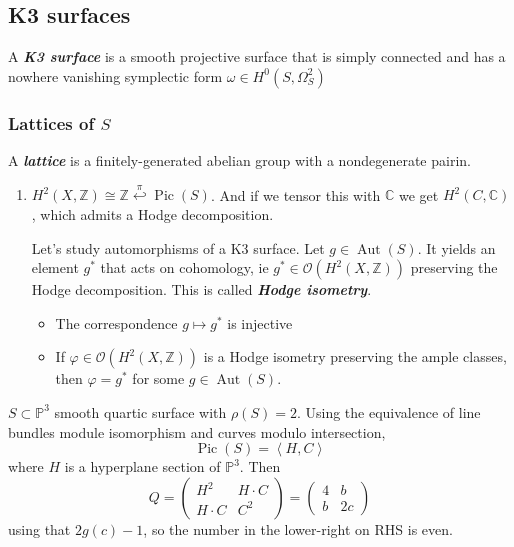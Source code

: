 \subsection{K3 surfaces}

\begin{defn}
	A \textit{\textbf{K3 surface}} is a smooth projective surface that is simply connected and has a nowhere vanishing symplectic form $\omega\in H^{0}(S,\Omega^2_S)$
\end{defn}

\subsubsection{Lattices of $S$}

A \textit{\textbf{lattice}} is a finitely-generated abelian group with a nondegenerate pairin.

\begin{enumerate}
	\item $H^{2}(X,\mathbb{Z})\cong \mathbb{Z} \overset{\pi}{\hookleftarrow}\operatorname{Pic}(S) $. And if we tensor this with $\mathbb{C}$ we get $H^{2}(C,\mathbb{C})$, which admits a Hodge decomposition.

		Let's study automorphisms of a K3 surface. Let $g\in\operatorname{Aut}(S)$. It yields an element $g^*$ that acts on cohomology, ie $g^*\in\mathcal{O}(H^{2}(X,\mathbb{Z}))$ preserving the Hodge decomposition. This is called \textit{\textbf{Hodge isometry}}.

\begin{thm}\leavevmode
	\begin{itemize}
	\item The correspondence $g\mapsto g^*$ is injective 
	
	\item If $\varphi\in\mathcal{O}(H^{2}(X,\mathbb{Z}))$ is a Hodge isometry preserving the ample classes, then $\varphi=g^*$ for some $g\in\operatorname{Aut}(S)$.
	\end{itemize}
\end{thm}
\end{enumerate}

\begin{example}
	$S\subset \mathbb{P}^3$ smooth quartic surface with $\rho(S)=2$. Using the equivalence of line bundles module isomorphism and curves modulo intersection,
	\[\operatorname{Pic}(S)= \left<H,C\right> \]
	where $H$ is a hyperplane section of $\mathbb{P}^3$. Then
	\[Q=\begin{pmatrix} H^2& H\cdot C\\H\cdot C& C^2 \end{pmatrix} =\begin{pmatrix} 4&b\\b&2c \end{pmatrix} \]
	using that $2g(c)-1$, so the number in the lower-right on RHS is even.
\end{example}


